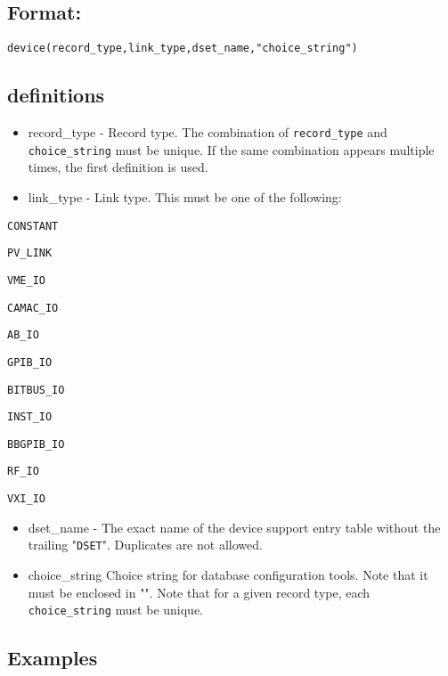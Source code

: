 \subsection{Format:}

\begin{verbatim}device(record_type,link_type,dset_name,"choice_string")
\end{verbatim}\subsection{definitions}

\begin{itemize}\item {}record\_type - Record type. The combination of \verb|record_type| and  \verb|choice_string| must be unique. If the 
same combination appears multiple times, the first definition is used. 

\item {}link\_type - Link type. This must be one of the following:

\end{itemize}\verb|CONSTANT|

\verb|PV_LINK|

\verb|VME_IO|

\verb|CAMAC_IO|

\verb|AB_IO|

\verb|GPIB_IO|

\verb|BITBUS_IO|

\verb|INST_IO|

\verb|BBGPIB_IO|

\verb|RF_IO|

\verb|VXI_IO|

\begin{itemize}\item {}dset\_name -  The exact name of the device support entry table without the trailing "\verb|DSET|". Duplicates are not 
allowed.

\item {}choice\_string  Choice string for database configuration tools. Note that it must be enclosed in "". Note that for a 
given record type, each \verb|choice_string| must be unique.

\end{itemize}\subsection{Examples}

